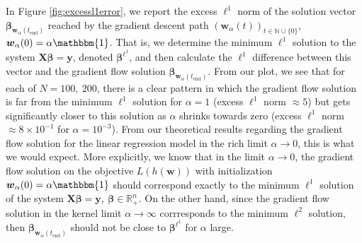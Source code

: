 \documentclass{article}
\begin{document}
In Figure \ref{fig:excessl1error}, we report the excess $\ell^1$ norm of the solution vector $\boldsymbol{\beta}_{\boldsymbol{w}_{\alpha}(t_{\text{end}})}$ reached by the gradient descent path $(\boldsymbol{w}_{\alpha}(t))_{t \in \mathbb{N}\cup \{0\}}$, $\boldsymbol{w}_{\alpha}(0) = \alpha \mathbbm{1}$. That is, we determine the minimum $\ell^1$ solution to the system $\boldsymbol{X} \boldsymbol{\beta} = \boldsymbol{y}$, denoted $\boldsymbol{\beta}^{\ell^1}$, and then calculate the $\ell^1$ difference between this vector and the gradient flow solution $\boldsymbol{\beta}_{\boldsymbol{w}_{\alpha}(t_{\text{end}})}$. From our plot, we see that for each of $N= 100, \ 200$, there is a clear pattern in which the gradient flow solution is far from the minimum $\ell^1$ solution for $\alpha =1$ (excess $\ell^1$ norm $\approx5$) but gets significantly closer to this solution as $\alpha$ shrinks towards zero (excess $\ell^1$ norm $\approx 8\times 10^{-1}$ for $\alpha = 10^{-3}$). From our theoretical results regarding the gradient flow solution for the linear regression model in the rich limit $\alpha \rightarrow 0$, this is what we would expect. More explicitly, we know that in the limit $\alpha \rightarrow 0$, the gradient flow solution on the objective $L(h(\boldsymbol{w}))$ with initialization $\boldsymbol{w}_{\alpha}(0) = \alpha \mathbbm{1}$ should correspond exactly to the minimum $\ell^1$ solution of the system $\boldsymbol{X} \boldsymbol{\beta} = \boldsymbol{y}, \ \boldsymbol{\beta} \in \mathbb{R}_+^n$. On the other hand, since the gradient flow solution in the kernel limit $\alpha \rightarrow \infty$ corrresponds to the minimum $\ell^2$ solution, then $\boldsymbol{\beta}_{\boldsymbol{w}_{\alpha}(t_{\text{end}})}$ should not be close to $\boldsymbol{\beta}^{\ell^1}$ for $\alpha$ large.
\end{document}
